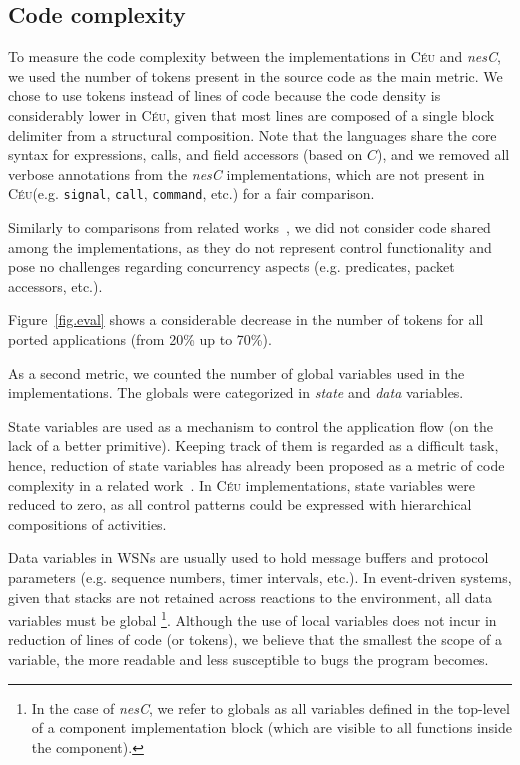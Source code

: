 \documentclass[10pt]{sensys-proc}
\newcommand{\CEU}{\textsc{C\'{e}u}\xspace}
\newcommand{\code}[1] {{\small{\texttt{#1}}}}
\begin{document}

\subsection{Code complexity}
\label{sec.eval.code}

To measure the code complexity between the implementations in \CEU and 
\emph{nesC}, we used the number of tokens present in the source code as the 
main metric.
We chose to use tokens instead of lines of code because the code density is 
considerably lower in \CEU, given that most lines are composed of a single 
block delimiter from a structural composition.
Note that the languages share the core syntax for expressions, calls, and field 
accessors (based on $C$), and we removed all verbose annotations from the 
\emph{nesC} implementations, which are not present in \CEU (e.g. \code{signal}, 
\code{call}, \code{command}, etc.) for a fair comparison.

Similarly to comparisons from related works~\cite{wsn.ocram,wsn.protothreads}, 
we did not consider code shared among the implementations, as they do not 
represent control functionality and pose no challenges regarding concurrency 
aspects (e.g. predicates, packet accessors, etc.).

Figure~\ref{fig.eval} shows a considerable decrease in the number of tokens for 
all ported applications (from 20\% up to 70\%).

As a second metric, we counted the number of global variables used in the 
implementations.
The globals were categorized in \emph{state} and \emph{data} variables.

State variables are used as a mechanism to control the application flow (on the 
lack of a better primitive).
Keeping track of them is regarded as a difficult task, hence, reduction of 
state variables has already been proposed as a metric of code complexity in a 
related work~\cite{wsn.protothreads}.
In \CEU implementations, state variables were reduced to zero, as all control 
patterns could be expressed with hierarchical compositions of activities.

Data variables in WSNs are usually used to hold message buffers and protocol 
parameters (e.g. sequence numbers, timer intervals, etc.).
In event-driven systems, given that stacks are not retained across reactions to 
the environment, all data variables must be global%
\footnote{In the case of \emph{nesC}, we refer to globals as all variables 
defined in the top-level of a component implementation block (which are visible 
to all functions inside the component).}.
Although the use of local variables does not incur in reduction of lines of 
code (or tokens), we believe that the smallest the scope of a variable, the 
more readable and less susceptible to bugs the program becomes.
\end{document}
